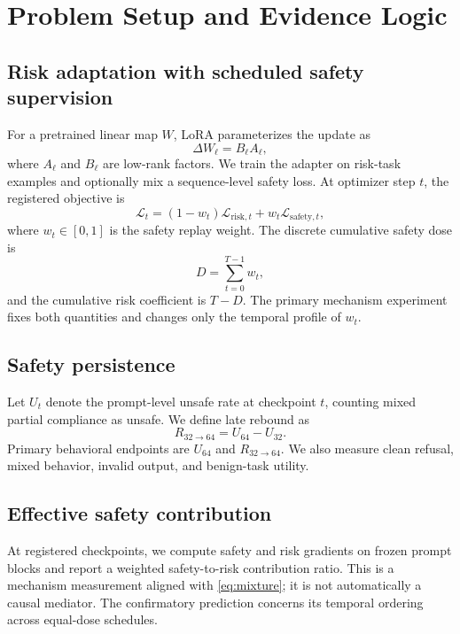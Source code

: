\section{Problem Setup and Evidence Logic}

\subsection{Risk adaptation with scheduled safety supervision}

For a pretrained linear map $W$, LoRA parameterizes the update as
\begin{equation}
  \Delta W_\ell = B_\ell A_\ell,
\end{equation}
where $A_\ell$ and $B_\ell$ are low-rank factors. We train the adapter on risk-task examples and optionally mix a sequence-level safety loss. At optimizer step $t$, the registered objective is
\begin{equation}
  \mathcal{L}_t = (1-w_t)\mathcal{L}_{\mathrm{risk},t} + w_t\mathcal{L}_{\mathrm{safety},t},
  \label{eq:mixture}
\end{equation}
where $w_t\in[0,1]$ is the safety replay weight. The discrete cumulative safety dose is
\begin{equation}
  D = \sum_{t=0}^{T-1} w_t,
  \label{eq:dose}
\end{equation}
and the cumulative risk coefficient is $T-D$. The primary mechanism experiment fixes both quantities and changes only the temporal profile of $w_t$.

\subsection{Safety persistence}

Let $U_t$ denote the prompt-level unsafe rate at checkpoint $t$, counting mixed partial compliance as unsafe. We define late rebound as
\begin{equation}
  R_{32\rightarrow64}=U_{64}-U_{32}.
\end{equation}
Primary behavioral endpoints are $U_{64}$ and $R_{32\rightarrow64}$. We also measure clean refusal, mixed behavior, invalid output, and benign-task utility.

\subsection{Effective safety contribution}

At registered checkpoints, we compute safety and risk gradients on frozen prompt blocks and report a weighted safety-to-risk contribution ratio. This is a mechanism measurement aligned with \cref{eq:mixture}; it is not automatically a causal mediator. The confirmatory prediction concerns its temporal ordering across equal-dose schedules.


